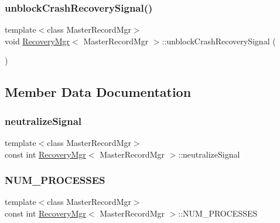\mbox{\label{classRecoveryMgr_a6158fad92d9250812d4a8f92a730aecd}} 
\subsubsection{\texorpdfstring{unblock\+Crash\+Recovery\+Signal()}{unblockCrashRecoverySignal()}}
{\footnotesize\ttfamily template$<$class Master\+Record\+Mgr$>$ \\
void \hyperlink{classRecoveryMgr}{Recovery\+Mgr}$<$ Master\+Record\+Mgr $>$\+::unblock\+Crash\+Recovery\+Signal (\begin{DoxyParamCaption}{ }\end{DoxyParamCaption})\hspace{0.3cm}{\ttfamily [inline]}}



\subsection{Member Data Documentation}
\mbox{\label{classRecoveryMgr_a2447fa0d8ee553b79e9d9cc838162639}} 
\subsubsection{\texorpdfstring{neutralize\+Signal}{neutralizeSignal}}
{\footnotesize\ttfamily template$<$class Master\+Record\+Mgr$>$ \\
const int \hyperlink{classRecoveryMgr}{Recovery\+Mgr}$<$ Master\+Record\+Mgr $>$\+::neutralize\+Signal}

\mbox{\label{classRecoveryMgr_a3b3011e6a4a07820477038c246a0d801}} 
\subsubsection{\texorpdfstring{N\+U\+M\+\_\+\+P\+R\+O\+C\+E\+S\+S\+ES}{NUM\_PROCESSES}}
{\footnotesize\ttfamily template$<$class Master\+Record\+Mgr$>$ \\
const int \hyperlink{classRecoveryMgr}{Recovery\+Mgr}$<$ Master\+Record\+Mgr $>$\+::N\+U\+M\+\_\+\+P\+R\+O\+C\+E\+S\+S\+ES}


